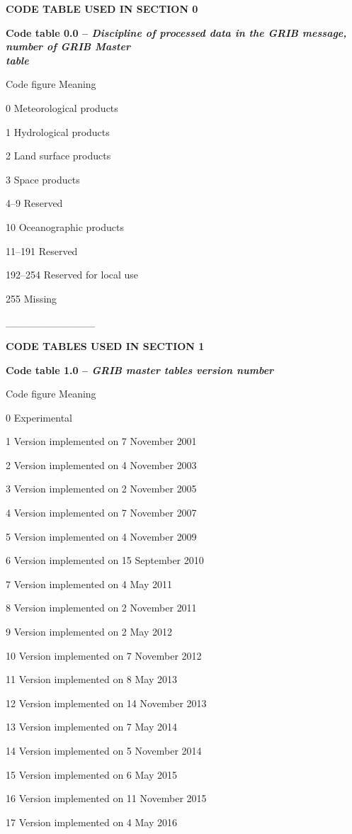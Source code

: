 \textbf{CODE TABLE USED IN SECTION 0}

\textbf{Code table 0.0 -- \emph{Discipline of processed data in the GRIB message, number of GRIB Master\\
table}}

Code figure Meaning

0 Meteorological products

1 Hydrological products

2 Land surface products

3 Space products

4--9 Reserved

10 Oceanographic products

11--191 Reserved

192--254 Reserved for local use

255 Missing

\_\_\_\_\_\_\_\_\_\_\_\_

\textbf{CODE TABLES USED IN SECTION 1}

\textbf{Code table 1.0 -- \emph{GRIB master tables version number}}

Code figure Meaning

0 Experimental

1 Version implemented on 7 November 2001

2 Version implemented on 4 November 2003

3 Version implemented on 2 November 2005

4 Version implemented on 7 November 2007

5 Version implemented on 4 November 2009

6 Version implemented on 15 September 2010

7 Version implemented on 4 May 2011

8 Version implemented on 2 November 2011

9 Version implemented on 2 May 2012

10 Version implemented on 7 November 2012

11 Version implemented on 8 May 2013

12 Version implemented on 14 November 2013

13 Version implemented on 7 May 2014

14 Version implemented on 5 November 2014

15 Version implemented on 6 May 2015

16 Version implemented on 11 November 2015

17 Version implemented on 4 May 2016

